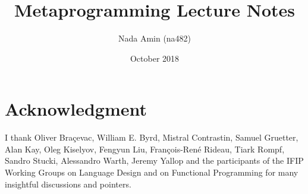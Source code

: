 \documentclass{book}
\begin{document}
%
\setcounter{chapter}{-1}

\title{Metaprogramming Lecture Notes}
\author{Nada Amin (na482)}
\date{October 2018}
\maketitle

\tableofcontents







\nocite{sicp}

\chapter*{Acknowledgment}

I thank Oliver Bra\c{c}evac, William E. Byrd, Mistral Contrastin,
Samuel Gruetter, Alan Kay, Oleg Kiselyov, Fengyun Liu,
Fran\c{c}ois-Ren\'e Rideau, Tiark Rompf, Sandro Stucki, Alessandro
Warth, Jeremy Yallop and the participants of the IFIP Working Groups
on Language Design and on Functional Programming for many insightful
discussions and pointers.

\clearpage


\end{document}
